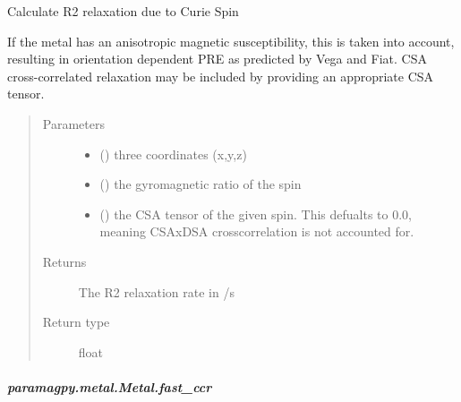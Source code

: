 \documentclass[a4paper,10pt,english,openany,oneside]{sphinxmanual}
\begin{document}
\begin{fulllineitems}
\begin{fulllineitems}
\begin{fulllineitems}
\label{\detokenize{reference/generated/paramagpy.metal.Metal.dsa_r2:paramagpy.metal.Metal.dsa_r2}}
Calculate R2 relaxation due to Curie Spin

If the metal has an anisotropic magnetic susceptibility, this is
taken into account, resulting in orientation dependent PRE as
predicted by Vega and Fiat. CSA cross-correlated relaxation may
be included by providing an appropriate CSA tensor.
\begin{quote}\begin{description}
\item[{Parameters}] \leavevmode\begin{itemize}
\item {} 
 () \textendash{} three coordinates (x,y,z)

\item {} 
 () \textendash{} the gyromagnetic ratio of the spin

\item {} 
 (\sphinxstyleliteralemphasis{\sphinxupquote{ (}}\sphinxstyleliteralemphasis{\sphinxupquote{)}}) \textendash{} the CSA tensor of the given spin.
This defualts to 0.0, meaning CSAxDSA crosscorrelation is
not accounted for.

\end{itemize}

\item[{Returns}] \leavevmode
{} \textendash{} The R2 relaxation rate in /s

\item[{Return type}] \leavevmode
float

\end{description}\end{quote}

\end{fulllineitems}



\subparagraph{paramagpy.metal.Metal.fast\_ccr}
\label{\detokenize{reference/generated/paramagpy.metal.Metal.fast_ccr:paramagpy-metal-metal-fast-ccr}}\label{\detokenize{reference/generated/paramagpy.metal.Metal.fast_ccr::doc}}


\end{fulllineitems}
\end{fulllineitems}
\end{document}
